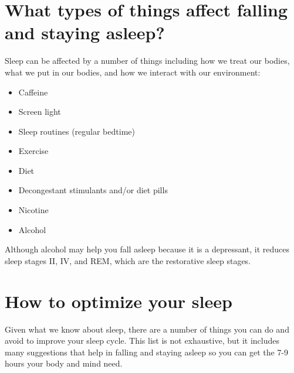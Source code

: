 \documentclass[../main.tex]{subfiles}
\begin{document}
\section{What types of things affect falling and staying asleep?}
Sleep can be affected by a number of things including how we treat our bodies,
what we put in our bodies, and how we interact with our environment:
%
\begin{itemize}
  \item Caffeine
  \item Screen light
  \item Sleep routines (regular bedtime)
  \item Exercise
  \item Diet
  \item Decongestant stimulants and/or diet pills
  \item Nicotine
  \item Alcohol
\end{itemize}
%
Although alcohol may help you fall asleep because it is a depressant, it reduces
sleep stages II, IV, and REM, which are the restorative sleep stages.
%
\section{How to optimize your sleep}
Given what we know about sleep, there are a number of things you can do and
avoid to improve your sleep cycle. This list is not exhaustive, but it includes
many suggestions that help in falling and staying asleep so you can get the 7-9
hours your body and mind need.
\end{document}
